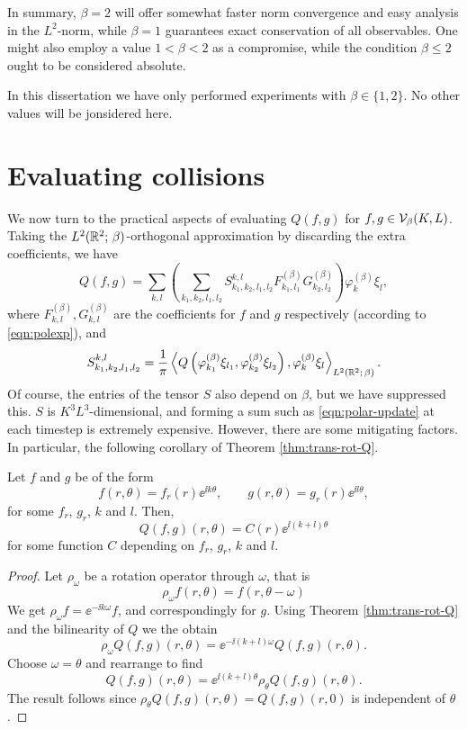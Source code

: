In summary, $\beta=2$ will offer somewhat faster norm convergence and easy analysis in the $L^2$-norm, while
$\beta=1$ guarantees exact conservation of all observables. One might also employ a value $1<\beta<2$ as a
compromise, while the condition $\beta \leq 2$ ought to be considered absolute.

In this dissertation we have only performed experiments with $\beta\in\{1,2\}$. No other values will be
jonsidered here.

\section{Evaluating collisions}
\label{sec:polar-evaluating}

We now turn to the practical aspects of evaluating $Q(f,g)$ for $f,g\in \mathcal{V}_\beta(K,L)$. Taking the
$L^2(\mathbb{R}^2;\,\beta)$-orthogonal approximation by discarding the extra coefficients, we have
\begin{equation} \label{eqn:polar-update}
    Q(f,g) = \sum_{k,l}\left(\sum_{k_1,k_2,l_1,l_2}
             S_{k_1,k_2,l_1,l_2}^{k,l} F^{(\beta)}_{k_1,l_1} G^{(\beta)}_{k_2,l_2} \right)
             \varphi^{(\beta)}_k\xi_l,
\end{equation}
where $F^{(\beta)}_{k,l}, G^{(\beta)}_{k,l}$ are the coefficients for $f$ and $g$ respectively (according to
\eqref{eqn:polexp}), and
\[
    S_{k_1,k_2,l_1,l_2}^{k,l} = \frac{1}{\pi} \left\langle Q\left(\varphi^{(\beta)}_{k_1} \xi_{l_1},
    \varphi^{(\beta)}_{k_2} \xi_{l_2}\right), \varphi^{(\beta)}_k \xi_l \right\rangle_{L^2(\mathbb{R}^2;\,\beta)}.
\]
Of course, the entries of the tensor $S$ also depend on $\beta$, but we have suppressed this. $S$ is
$K^3L^3$-dimensional, and forming a sum such as \eqref{eqn:polar-update} at each timestep is extremely
expensive. However, there are some mitigating factors. In particular, the following corollary of Theorem
\ref{thm:trans-rot-Q}.
\begin{corollary} \label{cor:rot-Q}
Let $f$ and $g$ be of the form
\[
    f(r,\theta) = f_r(r) \ee^{\ii k \theta}, \qquad g(r,\theta) = g_r(r) \ee^{\ii l \theta},
\]
for some $f_r$, $g_r$, $k$ and $l$. Then,
\[
    Q(f,g)(r,\theta) = C(r) \ee^{\ii (k+l) \theta}
\]
for some function $C$ depending on $f_r$, $g_r$, $k$ and $l$.
\end{corollary}
\begin{proof}
Let $\rho_\omega$ be a rotation operator through $\omega$, that is
\[
    \rho_\omega f(r,\theta) = f(r,\theta-\omega)
\]
We get $\rho_\omega f = \ee^{-\ii k \omega} f$, and correspondingly for $g$. Using Theorem
\ref{thm:trans-rot-Q} and the bilinearity of $Q$ we the obtain
\[
    \rho_\omega Q(f,g)(r,\theta) = \ee^{-\ii (k+l) \omega} Q(f,g)(r,\theta).
\]
Choose $\omega=\theta$ and rearrange to find
\[
    Q(f,g)(r,\theta) = \ee^{\ii (k+l) \theta} \rho_\theta Q(f,g)(r,\theta).
\]
The result follows since $\rho_\theta Q(f,g)(r,\theta) = Q(f,g)(r,0)$ is independent of $\theta$.
\end{proof}
